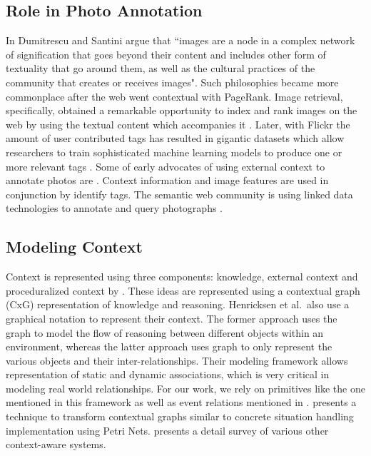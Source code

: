 \subsection{Role in Photo Annotation}
In \cite{dumitrescu2009context} Dumitrescu and Santini argue that ``images are a node in a complex network of signification that goes beyond their content and includes other form of textuality that go around them, as well as the cultural practices of the community that creates or receives images". Such philosophies became more commonplace after the web went contextual with PageRank. Image retrieval, specifically, obtained a remarkable opportunity to index and rank images on the web by using the textual content which accompanies it \cite{chen2001web, frankel1996webseer}. Later, with Flickr the amount of user contributed tags has resulted in gigantic datasets which allow researchers to train sophisticated machine learning models to produce one or more relevant tags \cite{brachmann2013feature, li2013geo, liu2013heterogeneous}. Some of early advocates of using external context to annotate photos are \cite{datta2008image, jain2010content}. Context information and image features are used in conjunction by \cite{o2009context, cao2008annotating, boutell2005beyond, cao2008eventscene} identify tags. The semantic web community is using linked data technologies to annotate and query photographs \cite{monaghan2006automating, nowack2006confoto}. 

\subsection{Modeling Context}
Context is represented using three components: knowledge, external context and proceduralized context by \cite{brezillon2003context}. These ideas are represented using a contextual graph (CxG) representation of knowledge and reasoning. Henricksen et al.\ also use a graphical notation to represent their context. The former approach uses the graph to model the flow of reasoning between different objects within an environment, whereas the latter approach uses graph to only represent the various objects and their inter-relationships. Their modeling framework allows representation of static and dynamic associations, which is very critical in modeling real world relationships. For our work, we rely on primitives like the one mentioned in this framework as well as event relations mentioned in \cite{gupta2011managing}. \cite{reignier2007context} presents a technique to transform contextual graphs similar to concrete situation handling implementation using Petri Nets. \cite{hong2009context} presents a detail survey of various other context-aware systems.

